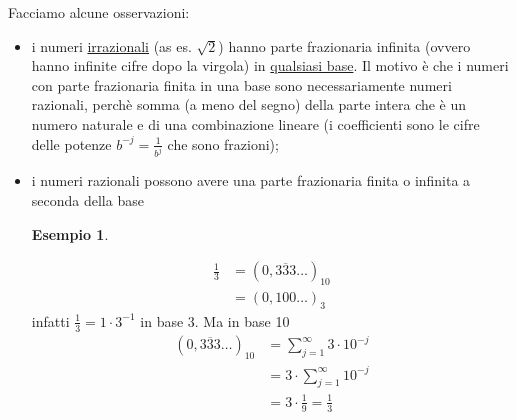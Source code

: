 \documentclass[12pt]{article}
\newtheorem*{esempio}{Esempio}
\begin{document}
Facciamo alcune osservazioni:
\begin{itemize}
    \item i numeri \underline{irrazionali} (as es. $\sqrt{2}$) hanno parte frazionaria infinita (ovvero hanno infinite cifre dopo la virgola) in \underline{qualsiasi base}. Il motivo è che i numeri con parte frazionaria finita in una base sono necessariamente numeri razionali, perchè somma (a meno del segno) della parte intera che è un numero naturale e di una combinazione lineare (i coefficienti sono le cifre delle potenze $b^{-j} = \frac{1}{b^j}$ che sono frazioni);
    \item i numeri razionali possono avere una parte frazionaria finita o infinita a seconda della base
    \begin{esempio} \end{esempio}
    \[ \begin{split}
        \frac{1}{3} & = (0,\overline{333} \dotsc)_{10} \\
        & = (0,100 \dotsc)_{3}
    \end{split} \]
    infatti $\frac{1}{3} = 1 \cdot 3^{-1}$ in base 3. Ma in base 10
    \[ \begin{split}
        (0,\overline{333} \dotsc)_{10} & = \sum_{j=1}^{\infty} 3 \cdot 10^{-j} \\
        & = 3 \cdot \sum_{j=1}^{\infty} 10^{-j} \\
        & = 3 \cdot \frac{1}{9} = \frac{1}{3} \\
        \end{split} 
        \]
\end{itemize}
\end{document}
